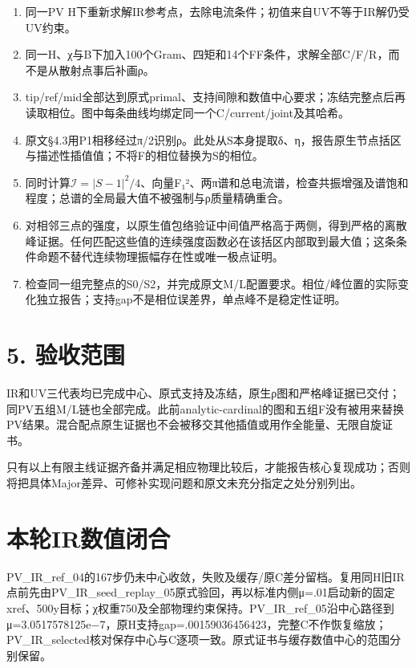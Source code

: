 \documentclass[
  10pt,
  a4paper,
]{article}
\providecommand{\tightlist}{%
  \setlength{\itemsep}{0pt}\setlength{\parskip}{0pt}}
\begin{document}
\begin{enumerate}
\def\labelenumi{\arabic{enumi}.}
\tightlist
\item
  同一PV
  H下重新求解IR参考点，去除电流条件；初值来自UV不等于IR解仍受UV约束。
\item
  同一H、χ与B下加入100个Gram、四矩和14个FF条件，求解全部C/F/R，而不是从散射点事后补画ρ。
\item
  tip/ref/mid全部达到原式primal、支持间隙和数值中心要求；冻结完整点后再读取相位。图中每条曲线均绑定同一个C/current/joint及其哈希。
\item
  原文§4.3用P1相移经过π/2识别ρ。此处从S本身提取δ、η，报告原生节点括区与描述性插值值；不将F的相位替换为S的相位。
\item
  同时计算\(\mathcal I=|S-1|^2/4\)、向量\textbar F₁\textbar²、两π谱和总电流谱，检查共振增强及谱饱和程度；总谱的全局最大值不被强制与ρ质量精确重合。
\item
  对相邻三点的强度，以原生值包络验证中间值严格高于两侧，得到严格的离散峰证据。任何匹配这些值的连续强度函数必在该括区内部取到最大值；这条条件命题不替代连续物理振幅存在性或唯一极点证明。
\item
  检查同一组完整点的S0/S2，并完成原文M/L配置要求。相位/峰位置的实际变化独立报告；支持gap不是相位误差界，单点峰不是稳定性证明。
\end{enumerate}

\section{5. 验收范围}\label{ux9a8cux6536ux8303ux56f4}

IR和UV三代表均已完成中心、原式支持及冻结，原生ρ图和严格峰证据已交付；同PV五组M/L链也全部完成。此前analytic-cardinal的图和五组F没有被用来替换PV结果。混合配点原生证据也不会被移交其他插值或用作全能量、无限自旋证书。

只有以上有限主线证据齐备并满足相应物理比较后，才能报告核心复现成功；否则将把具体Major差异、可修补实现问题和原文未充分指定之处分别列出。

\section{本轮IR数值闭合}\label{ux672cux8f6eirux6570ux503cux95edux5408}

PV\_IR\_ref\_04的167步仍未中心收敛，失败及缓存/原C差分留档。复用同H旧IR点前先由PV\_IR\_seed\_replay\_05原式验回，再以标准内侧μ=.01启动新的固定xref、500y目标；χ权重750及全部物理约束保持。PV\_IR\_ref\_05沿中心路径到μ=3.0517578125e−7，原H支持gap=.00159036456423，完整C不作恢复缩放；PV\_IR\_selected核对保存中心与C逐项一致。原式证书与缓存数值中心的范围分别保留。
\end{document}

